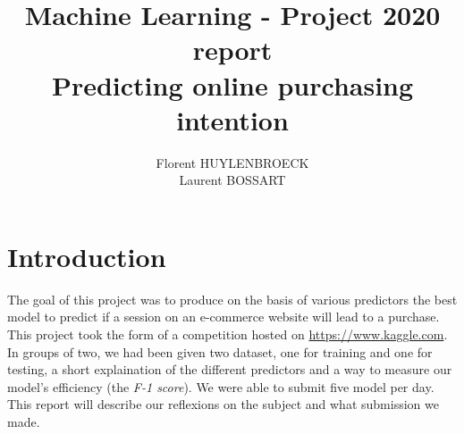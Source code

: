\documentclass[11pt]{article}
\title{Machine Learning - Project 2020 report\\
\small Predicting online purchasing intention}
\author{Florent HUYLENBROECK\\
Laurent BOSSART}
\begin{document}
\maketitle
\newpage
\section*{Introduction}
The goal of this project was to produce on the basis of various predictors the best model to predict if a session on an e-commerce website will lead to a purchase.
This project took the form of a competition hosted on \url{ https://www.kaggle.com}. \\
In groups of two, we had been given two dataset, one for training and one for testing, a short explaination of the different predictors and a way to measure our model's efficiency (the \emph{F-1 score}). We were able to submit five model per day.\\
This report will describe our reflexions on the subject and what submission we made.
\end{document}

